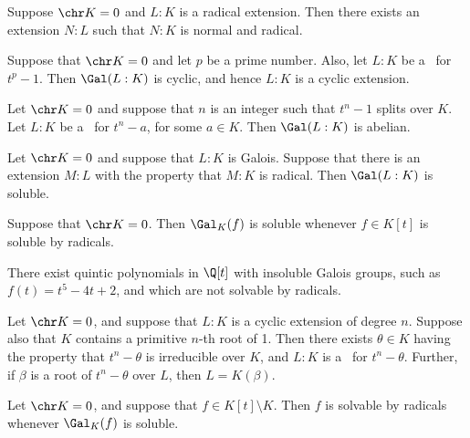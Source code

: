\documentclass{article}
\begin{document}
  \begin{lemma}
    Suppose \( \chr K = 0 \) and \( L:K \) is a radical extension. Then there exists an extension \( N:L \) such that \( N:K \) is normal and radical.
  \end{lemma}

  \begin{lemma}
    Suppose that \( \chr K = 0 \) and let \( p \) be a prime number. Also, let \( L:K \) be a \sfe~for \( t^p-1 \). Then \( \Gal(L:K) \) is cyclic, and hence \( L:K \) is a cyclic extension.
  \end{lemma}

  \begin{lemma}
    Let \( \chr K = 0 \) and suppose that \( n \) is an integer such that \( t^n-1 \) splits over \( K \). Let \( L:K \) be a \sfe~for \( t^n-a \), for some \( a\in K \). Then \( \Gal(L:K) \) is abelian.
  \end{lemma}

  \begin{ttheorem}
    Let \( \chr K = 0 \) and suppose that \( L:K \) is Galois. Suppose that there is an extension \( M:L \) with the property that \( M:K \) is radical. Then \( \Gal(L:K) \) is soluble.
  \end{ttheorem}

  \begin{tcorollary}
    Suppose that \( \chr K = 0 \). Then \( \Gal_K(f) \) is soluble whenever \( f\in K[t] \) is soluble by radicals.
  \end{tcorollary}

  \begin{tcorollary}
    There exist quintic polynomials in \( \Q[t] \) with insoluble Galois groups, such as \( f(t) = t^5-4t+2 \), and which are not solvable by radicals.
  \end{tcorollary}

  \begin{lemma}
    Let \( \chr K = 0 \), and suppose that \( L:K \) is a cyclic extension of degree \( n \). Suppose also that \( K \) contains a primitive \( n \)-th root of 1. Then there exists \( \theta \in K \) having the property that \( t^n -\theta \) is irreducible over \( K \), and \( L:K \) is a \sfe~for \( t^n-\theta \). Further, if \( \beta \) is a root of \( t^n-\theta \) over \( L \), then \( L=K(\beta) \).
  \end{lemma}

  \begin{ttheorem}
    Let \( \chr K = 0 \), and suppose that \( f\in K[t]\setminus K \). Then \( f \) is solvable by radicals whenever \( \Gal_K(f) \) is soluble.
  \end{ttheorem}
\end{document}
